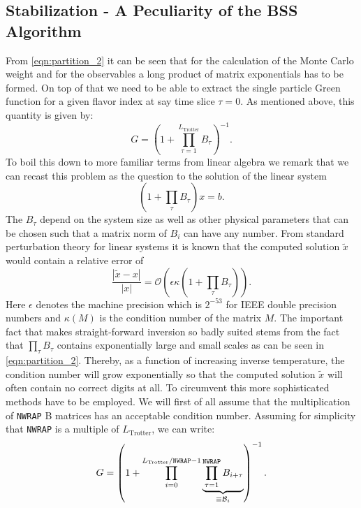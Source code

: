 

\subsection{Stabilization - A Peculiarity of the BSS Algorithm}\label{sec:stable}
From \eqref{eqn:partition_2} it can be seen that for the calculation of the Monte Carlo weight
and for the observables a long product of matrix exponentials has to be formed.
On top of that we need to be able to extract the single particle Green function  for a given flavor index at say time slice $\tau = 0$.  As  mentioned above, this quantity is given by: 
\begin{equation}
G = \left( 1 + \prod_{ \tau= 1}^{L_{\text{Trotter}}} B_\tau \right)^{-1}.
\end{equation}
To boil this down to more familiar terms from linear algebra we remark that we can recast this problem as the question to the solution of the linear system
\begin{equation}
(1 + \prod_\tau B_\tau) x = b.
\end{equation}
The $B_\tau$ depend on the system size as well as other physical parameters that can be chosen such that a matrix norm of $B_i$ can have any number.
From standard perturbation theory for linear systems it is known that the computed solution $\tilde{x}$ would 
contain a relative error of
\begin{equation}
\frac{|\tilde{x} - x|}{|x|} = \mathcal{O}\left(\epsilon \kappa(1 + \prod_\tau B_\tau)\right).
\end{equation}
Here $\epsilon$ denotes the machine precision which is $2^{-53}$ for IEEE double precision numbers
and $\kappa(M)$ is the condition number of the matrix $M$.
The important fact that makes straight-forward inversion so badly suited  stems from the fact that $  \prod_ \tau B_\tau $ contains exponentially large and small scales as can be seen in \eqref{eqn:partition_2}.  Thereby, as a function of increasing inverse temperature, 
the condition number  will grow exponentially so that the computed solution $\tilde{x}$
will often contain no correct digits at all.
To circumvent this more sophisticated methods have to be employed.   We will first of all assume that  the multiplication of  \texttt{NWRAP}  B matrices   has an acceptable condition number.   Assuming for simplicity that \texttt{NWRAP} is a multiple of  $L_{\text{Trotter}}$, we  can write: 
\begin{equation}
G = \left( 1 + \prod_{ i = 0}^{L_{\text{Trotter}} /\texttt{NWRAP} -1}       \underbrace{\prod_{\tau=1}^{\texttt{NWRAP}} B_{i + \tau} }_{ \equiv {\cal B}_i}\right)^{-1}.
\end{equation}

